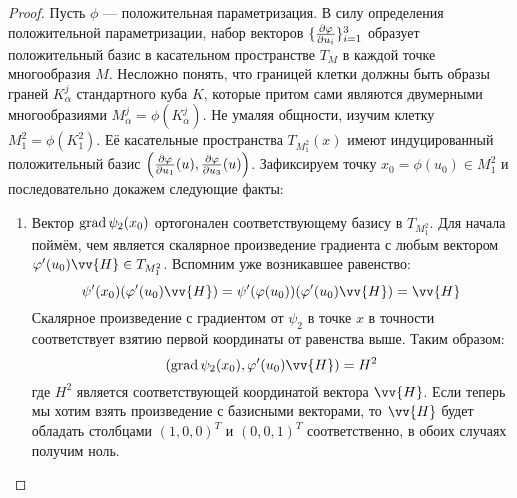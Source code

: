 \begin{proof}
	Пусть $\phi$ --- положительная параметризация. В силу определения положительной параметризации, набор векторов $\{\frac{\partial \varphi}{\partial u_i}\}_{i = 1}^3$ образует положительный базис в касательном пространстве $T_M$ в каждой точке многообразия $M$. Несложно понять, что границей клетки должны быть образы граней $K_\alpha^j$ стандартного куба $K$, которые притом сами являются двумерными многообразиями $M_\alpha^j = \phi(K_\alpha^j)$. Не умаляя общности, изучим клетку $M_1^2 = \phi(K_1^2)$. Её касательные пространства $T_{M_1^2}(x)$ имеют индуцированный положительный базис $\left(\frac{\partial \varphi}{\partial u_1}(u), \frac{\partial \varphi}{\partial u_3}(u)\right)$. Зафиксируем точку $x_0 = \phi(u_0) \in M_1^2$ и последовательно докажем следующие факты:
	\begin{enumerate}
		\item Вектор $\operatorname{grad} \psi_2(x_0)$ ортогонален соответствующему базису в $T_{M_1^2}$. Для начала поймём, чем является скалярное произведение градиента с любым вектором $\phi'(u_0)\vv{H} \in T_{M_1^2}$. Вспомним уже возникавшее равенство:
		\[
			\psi'(x_0)(\phi'(u_0)\vv{H}) = \psi'(\phi(u_0))(\phi'(u_0)\vv{H}) = \vv{H}
		\]
		Скалярное произведение с градиентом от $\psi_2$ в точке $x$ в точности соответствует взятию первой координаты от равенства выше. Таким образом:
		\[
			(\grad \psi_2(x_0), \phi'(u_0)\vv{H}) = H^2
		\]
		где $H^2$ является соответствующей координатой вектора $\vv{H}$. Если теперь мы хотим взять произведение с базисными векторами, то $\vv{H}$ будет обладать столбцами $(1, 0, 0)^T$ и $(0, 0, 1)^T$ соответственно, в обоих случаях получим ноль.
		

\end{enumerate}
\end{proof}
